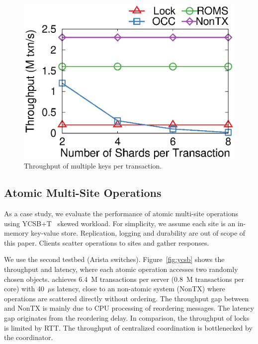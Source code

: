 \begin{figure}[t!]
\begin{minipage}{.31\textwidth}
		\centering
		\includegraphics[width=\textwidth]{gnuplot/multishard.eps}
		\caption{Throughput of multiple keys per transaction.}
		\label{fig:multishard}
    \end{minipage}
\end{figure}


\subsection{Atomic Multi-Site Operations}
\label{subsec:eval-kvs}



As a case study, we evaluate the performance of atomic multi-site operations using YCSB+T~\cite{dey2014ycsbt} skewed workload.
For simplicity, we assume each site is an in-memory key-value store.
Replication, logging and durability are out of scope of this paper.
Clients scatter operations to sites and gather responses.


We use the second testbed (Arista switches).
Figure~\ref{fig:ycsb} shows the throughput and latency, where each atomic operation accesses two randomly chosen objects.
\sys achieves 6.4~M transactions per server (0.8~M transactions per core) with 40~$\mu$s latency, close to an non-atomic system (NonTX) where operations are scattered directly without ordering.
The throughput gap between \sys and NonTX is mainly due to CPU processing of reordering messages.
The latency gap originates from the reordering delay.
In comparison, the throughput of locks is limited by RTT.
The throughput of centralized coordination is bottlenecked by the coordinator.

